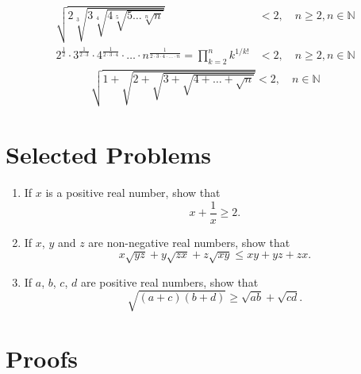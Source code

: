 \documentclass[a4paper,11pt]{article}
\begin{document}
\begin{equation}
    \begin{aligned}
        \sqrt{2\sqrt[3]{3\sqrt[4]{4\sqrt[5]{5\dots\sqrt[n]{n}}}}} &< 2, \quad n\geq2,n\in\mathbb{N} \\
        2^{\frac{1}{2}} \cdot 3^{\frac{1}{2\cdot3}} \cdot 4^{\frac{1}{2\cdot3\cdot4}} \cdot \ldots \cdot n^{{\frac{1}{2\cdot3\cdot4\cdot\ldots\cdot n}}} = \prod_{k=2}^n k^{1/k!} &< 2, \quad n\geq2,n\in\mathbb{N}
    \end{aligned}
\end{equation}
\vspace{13pt}
\begin{equation}
    \begin{aligned}
        \sqrt{1+\sqrt{2+\sqrt{3+\sqrt{4+\dots+\sqrt{n}}}}} < 2, \quad n\in\mathbb{N}
    \end{aligned}
\end{equation}
\vspace{13pt}


\section{Selected Problems}
\begin{center}
    \begin{enumerate}
        \item If $x$ is a positive real number, show that
        \[
        x+\frac{1}{x} \geq 2.
        \]
        \item If $x$, $y$ and $z$ are non-negative real numbers, show that
        \[
        x\sqrt{yz} + y\sqrt{zx} + z\sqrt{xy} \leq xy + yz + zx.
        \]
        \item If $a$, $b$, $c$, $d$ are positive real numbers, show that
        \[
        \sqrt{(a+c)(b+d)} \geq \sqrt{ab} + \sqrt{cd}.
        \]
    \end{enumerate}
\end{center}


\section{Proofs}
\end{document}
